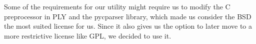 \noindent Some of the requirements for our utility might require us to modify
the C preprocessor in PLY and the pycparser library, which made us consider
the BSD the most suited license for us. Since it also gives us the option to
later move to a more restrictive license like GPL, we decided to use it.

